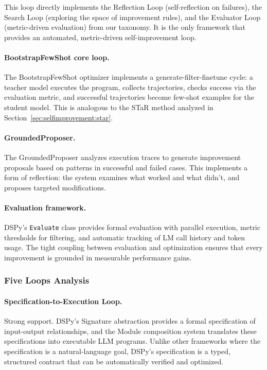 This loop directly implements the Reflection Loop (self-reflection on failures), the Search Loop (exploring the space of improvement rules), and the Evaluator Loop (metric-driven evaluation) from our taxonomy. It is the only framework that provides an automated, metric-driven self-improvement loop.

\paragraph{BootstrapFewShot core loop.}
The BootstrapFewShot optimizer implements a generate-filter-finetune cycle: a teacher model executes the program, collects trajectories, checks success via the evaluation metric, and successful trajectories become few-shot examples for the student model. This is analogous to the STaR method analyzed in Section~\ref{sec:selfimprovement:star}.

\paragraph{GroundedProposer.}
The GroundedProposer analyzes execution traces to generate improvement proposals based on patterns in successful and failed cases. This implements a form of reflection: the system examines what worked and what didn't, and proposes targeted modifications.

\paragraph{Evaluation framework.}
DSPy's \texttt{Evaluate} class provides formal evaluation with parallel execution, metric thresholds for filtering, and automatic tracking of LM call history and token usage. The tight coupling between evaluation and optimization ensures that every improvement is grounded in measurable performance gains.

\subsubsection{Five Loops Analysis}

\paragraph{Specification-to-Execution Loop.}
Strong support. DSPy's Signature abstraction provides a formal specification of input-output relationships, and the Module composition system translates these specifications into executable LLM programs. Unlike other frameworks where the specification is a natural-language goal, DSPy's specification is a typed, structured contract that can be automatically verified and optimized.

